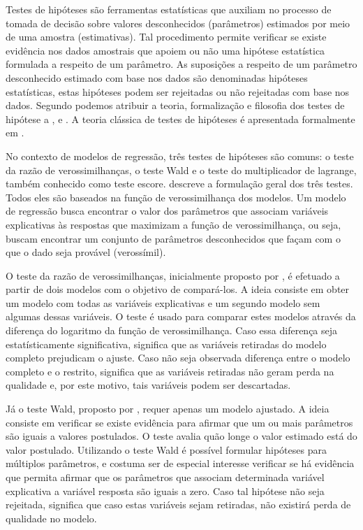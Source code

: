 Testes de hipóteses são ferramentas estatísticas que auxiliam no processo de tomada de decisão sobre valores desconhecidos (parâmetros) estimados por meio de uma amostra (estimativas). Tal procedimento permite verificar se existe evidência nos dados amostrais que apoiem ou não uma hipótese estatística formulada a respeito de um parâmetro. As suposições a respeito de um parâmetro desconhecido estimado com base nos dados são denominadas hipóteses estatísticas, estas hipóteses podem ser rejeitadas ou não rejeitadas com base nos dados. Segundo \citet{lehmann} podemos atribuir a teoria, formalização e filosofia dos testes de hipótese a \citet{neyman1}, \cite{neyman2} e \cite{fisher}. A teoria clássica de testes de hipóteses é apresentada formalmente em \citet{lehmann2}.

No contexto de modelos de regressão, três testes de hipóteses são comuns: o teste da razão de verossimilhanças, o teste Wald e o teste do multiplicador de lagrange, também conhecido como teste escore. \citet{engle} descreve a formulação geral dos três testes. Todos eles são baseados na função de verossimilhança dos modelos. Um modelo de regressão busca encontrar o valor dos parâmetros que associam variáveis explicativas às respostas que maximizam a função de verossimilhança, ou seja, buscam encontrar um conjunto de parâmetros desconhecidos que façam com o que o dado seja provável (verossímil).

O teste da razão de verossimilhanças, inicialmente proposto por \citet{trv}, é efetuado a partir de dois modelos com o objetivo de compará-los. A ideia consiste em obter um modelo com todas as variáveis explicativas e um segundo modelo sem algumas dessas variáveis. O teste é usado para comparar estes modelos através da diferença do logaritmo da função de verossimilhança. Caso essa diferença seja estatísticamente significativa, significa que as variáveis retiradas do modelo completo prejudicam o ajuste. Caso não seja observada diferença entre o modelo completo e o restrito, significa que as variáveis retiradas não geram perda na qualidade e, por este motivo, tais variáveis podem ser descartadas.

Já o teste Wald, proposto por \citet{wald}, requer apenas um modelo ajustado. A ideia consiste em verificar se existe evidência para afirmar que um ou mais parâmetros são iguais a valores postulados. O teste avalia quão longe o valor estimado está do valor postulado. Utilizando o teste Wald é possível formular hipóteses para múltiplos parâmetros, e costuma ser de especial interesse verificar se há evidência que permita afirmar que os parâmetros que associam determinada variável explicativa a variável resposta são iguais a zero. Caso tal hipótese não seja rejeitada, significa que caso estas variáveis sejam retiradas, não existirá perda de qualidade no modelo.

